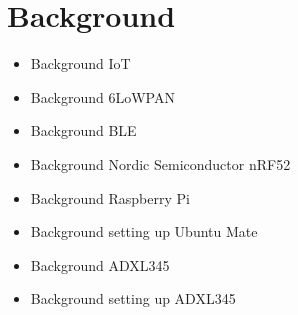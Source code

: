 \chapter{Background}
\label{chp:background} 

\begin{itemize}
  \item Background IoT
  \item Background 6LoWPAN
  \item Background BLE
  \item Background Nordic Semiconductor nRF52
  \item Background Raspberry Pi
  \item Background setting up Ubuntu Mate
  \item Background ADXL345
  \item Background setting up ADXL345
\end{itemize}